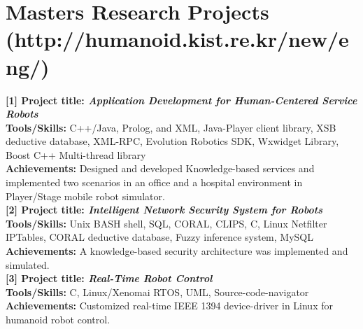 \documentclass[notopicbreak,contbibnum,plain]{simplecv}
\begin{document}
\section{\textbf{Masters Research Projects} (http://humanoid.kist.re.kr/new/eng/)}
\vspace*{-0.3cm}
\textbf{[1] Project title: \textit{Application Development for Human-Centered Service Robots}}\\
\textbf{Tools/Skills:} C++/Java, Prolog, and XML, Java-Player client library, XSB deductive database, XML-RPC, Evolution Robotics SDK, Wxwidget Library, Boost C++ Multi-thread library\\
\textbf{Achievements:} Designed and developed Knowledge-based services and implemented two scenarios in an office and a hospital environment in Player/Stage mobile robot simulator.\\
\textbf{[2] Project title: \textit{Intelligent Network Security System for Robots}}\\
\textbf{Tools/Skills:} Unix BASH shell, SQL, CORAL, CLIPS, C, Linux Netfilter IPTables, CORAL deductive database, Fuzzy inference system, MySQL\\
\textbf{Achievements:} A knowledge-based security architecture was implemented and simulated.\\
\textbf{[3] Project title:\textit{ Real-Time Robot Control}}\\
\textbf{Tools/Skills:} C, Linux/Xenomai RTOS, UML, Source-code-navigator\\
\textbf{Achievements:} Customized real-time IEEE 1394 device-driver in Linux for humanoid robot control.
\vspace*{-0.3cm}
\end{document}
